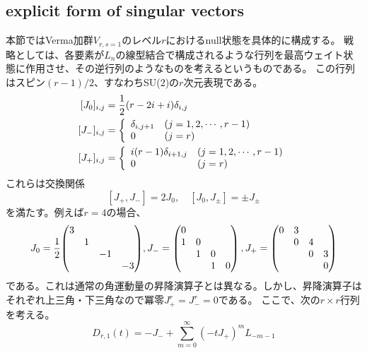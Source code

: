 \documentclass[11pt, aps, longbibliography]{article}
\numberwithin{equation}{section}
\begin{document}
    \subsection{explicit form of singular vectors}
    本節ではVerma加群$V_{r,s=1}$のレベル$r$におけるnull状態を具体的に構成する。
    戦略としては、各要素が$L_n$の線型結合で構成されるような行列を最高ウェイト状態に作用させ、その逆行列のようなものを考えるというものである。
    この行列はスピン$(r-1)/2$、すなわちSU(2)の$r$次元表現である。
    \begin{align}\label{eq:nullvec1}
        [J_0]_{i,j} &= \frac{1}{2}(r-2i+i)\delta_{i,j} \notag \\
        [J_-]_{i,j} &=\left\{\begin{array}{ll}
            \delta_{i,j+1} & (j=1,2,\cdots ,r-1) \\ 0 & (j=r)
        \end{array}\right. \\
        [J_+]_{i,j} &= \left\{\begin{array}{ll}
            i(r-1)\delta_{i+1,j} & (j=1,2,\cdots ,r-1) \\ 0 & (j=r)
        \end{array}\right. 
    \end{align}
    これらは交換関係
    \begin{equation}\label{eq:nullvec2}
        [J_+, J_-] = 2J_0, \quad [J_0,J_\pm] = \pm J_\pm
    \end{equation}
    を満たす。例えば$r=4$の場合、
    \begin{equation}\label{eq:nullvec3}
        J_0 = \frac{1}{2} \mqty(\dmat{3,1,-1,-3}), J_- = \begin{pmatrix}
            0 & & & \\ 1 & 0 & & \\ & 1 & 0 & \\ & & 1 & 0
        \end{pmatrix},
        J_+ = \begin{pmatrix}
            0 & 3 & & \\ & 0 & 4 & \\ & & 0 & 3 \\ & & & 0
        \end{pmatrix}
    \end{equation}
    である。これは通常の角運動量の昇降演算子とは異なる。しかし、昇降演算子はそれぞれ上三角・下三角なので冪零$J_+^r = J_-^r = 0$である。
    ここで、次の$r\times r$行列を考える。
    \begin{equation}\label{eq:nullvec4}
        D_{r,1}(t) = -J_- + \sum_{m=0}^{\infty} (-tJ_+)^m L_{-m-1}
    \end{equation}
\end{document}
